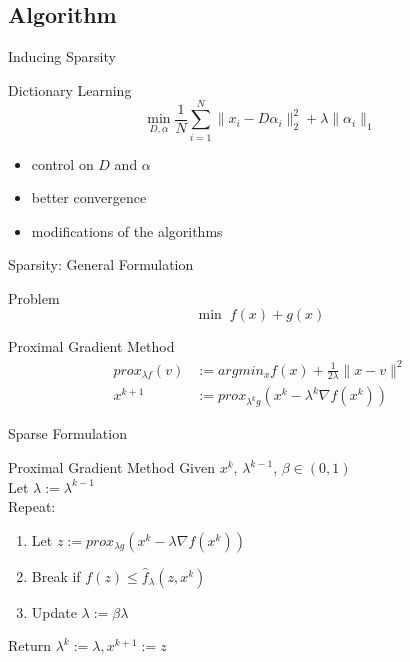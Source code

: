 \documentclass[11pt]{beamer}
\begin{document}
	\subsection{Algorithm}
	
	\begin{frame}{Inducing Sparsity}
		\begin{block}{Dictionary Learning}
			\begin{equation*}
				\min_{D, \alpha} \frac{1}{N} \sum_{i=1}^N \|x_i - D \alpha_i \|_2^2 + \lambda \| 
				\alpha_i \|_1
			\end{equation*}
			\begin{itemize}
				\item control on $D$ and $\alpha$
				\item better convergence
				\item modifications of the algorithms
			\end{itemize}
		\end{block}
	\end{frame}
	
	\begin{frame}{Sparsity: General Formulation}
		\begin{block}{Problem}
			\begin{equation*}
				\min \; f(x) +g(x)
			\end{equation*}
		\end{block}
		\begin{block}{Proximal Gradient Method}
			\begin{align*}
				prox_{\lambda f}(v) &:= argmin_x f(x) + \frac{1}{2 \lambda} \|x - v \|^2\\
				x^{k+1} &:= prox_{\lambda^k g} \left(x^k - \lambda^k \nabla f(x^k) \right)
			\end{align*}
		\end{block}
	\end{frame}
	
	\begin{frame}{Sparse Formulation}
		\begin{block}{Proximal Gradient Method}
			Given $x^k$, $\lambda^{k-1}$, $\beta \in (0, 1)$\\
			Let $\lambda := \lambda^{k-1}$\\
			Repeat:\\
			\begin{enumerate}
				\item Let $z:= prox_{\lambda g} \left(x^k - \lambda \nabla f(x^k) \right)$
				\item Break if $f(z) \leq \hat{f}_{\lambda}(z, x^k)$
				\item Update $\lambda := \beta \lambda $
			\end{enumerate}
			Return $\lambda^k := \lambda, x^{k+1} := z$
		\end{block}
	\end{frame}
	
\end{document}
